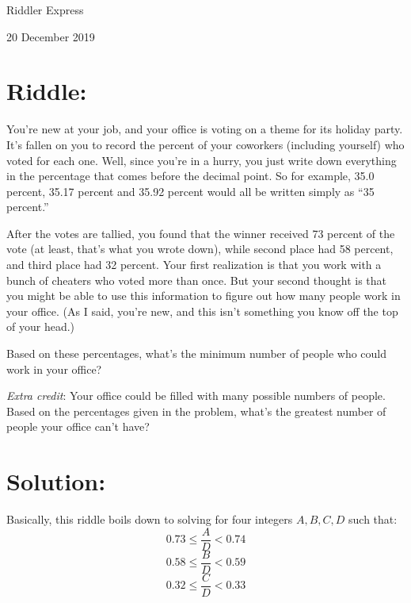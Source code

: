 \documentclass{article}
\begin{document}
\pagestyle{empty} %


\begin{center}
{\LARGE Riddler Express}

\vspace{0.15in}

{\Large 20 December 2019}
\end{center}


\section*{Riddle:}

You’re new at your job, and your office is voting on a theme for its holiday party.
It’s fallen on you to record the percent of your coworkers (including yourself) who voted for each one.
Well, since you’re in a hurry, you just write down everything in the percentage that comes before the decimal point.
So for example, 35.0 percent, 35.17 percent and 35.92 percent would all be written simply as “35 percent.”

After the votes are tallied, you found that the winner received 73 percent of the vote (at least, that’s what you wrote down), while second place had 58 percent, and third place had 32 percent.
Your first realization is that you work with a bunch of cheaters who voted more than once.
But your second thought is that you might be able to use this information to figure out how many people work in your office.
(As I said, you’re new, and this isn’t something you know off the top of your head.)

Based on these percentages, what’s the minimum number of people who could work in your office?

\textit{Extra credit}: Your office could be filled with many possible numbers of people. Based on the percentages given in the problem, what’s the greatest number of people your office can’t have?



\section*{Solution:}

Basically, this riddle boils down to solving for four integers $A, B, C, D$ such that:
\[
0.73\leq \frac{A}{D} <0.74
\]
\[
0.58\leq \frac{B}{D} <0.59
\]
\[
0.32\leq \frac{C}{D} <0.33
\]
\end{document}
